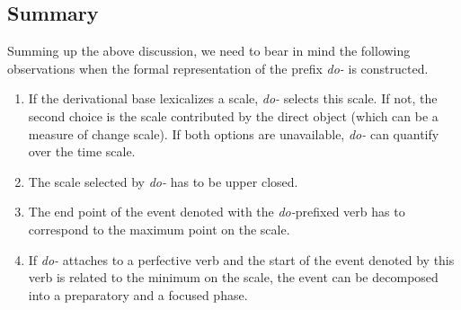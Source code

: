\subsection{Summary}
Summing up the above discussion, we need to bear in mind the following observations when the formal representation of the prefix \textit{do-} is constructed.
\begin{enumerate}
\item If the derivational base lexicalizes a scale, \textit{do-} selects this scale. If not, the second choice is the scale contributed by the direct object (which can be a measure of change scale). If both options are unavailable, \textit{do-} can quantify over the time scale.
\item The scale selected by \textit{do-} has to be upper closed.
\item The end point of the event denoted with the \textit{do-}prefixed verb has to correspond to the maximum point on the scale.
\item If \textit{do-} attaches to a perfective verb and the start of the event denoted by this verb is related to the minimum on the scale, the event can be decomposed into a preparatory and a focused phase.
\end{enumerate}

